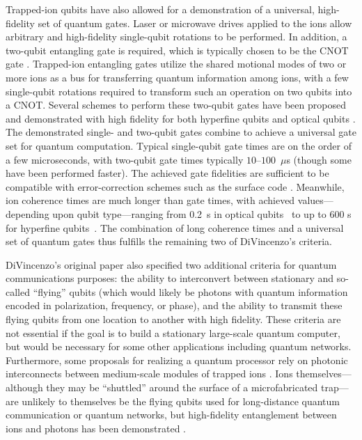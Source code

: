 \documentclass[%
12pt,
 amsmath,amssymb,
]{revtex4-2}
\begin{document}
Trapped-ion qubits have also allowed for a demonstration of a universal, high-fidelity set of quantum gates. Laser or microwave drives applied to the ions allow arbitrary and high-fidelity single-qubit rotations to be performed. In addition, a two-qubit entangling gate is required, which is typically chosen to be the CNOT gate \cite{BarencoElemGates1995}. Trapped-ion entangling gates utilize the shared motional modes of two or more ions as a bus for transferring quantum information among ions, with a few single-qubit rotations required to transform such an operation on two qubits into a CNOT. Several schemes to perform these two-qubit gates have been proposed \cite{CiracZollerGate, MolmerSorensenGate, LeibfriedDidiGate2003} and demonstrated with high fidelity for both hyperfine qubits \cite{Ballance2QubitHyperfineGate2016} and optical qubits \cite{BenhelmMSGate2008}. The demonstrated single- and two-qubit gates combine to achieve a universal gate set for quantum computation. Typical single-qubit gate times are on the order of a few microseconds, with two-qubit gate times typically $10$--$100$~$\mu$s (though some have been performed faster). The achieved gate fidelities are sufficient to be compatible with error-correction schemes such as the surface code \cite{RaussendorfSurfaceCode2007}. Meanwhile, ion coherence times are much longer than gate times, with achieved values---depending upon qubit type---ranging from 0.2~s in optical qubits~\cite{BermudezAssessing2017} to up to 600 s for hyperfine qubits~\cite{bollinger_IEEE_550s_ramsey,Wang10MinuteCoherence2017}. The combination of long coherence times and a universal set of quantum gates thus fulfills the remaining two of DiVincenzo's criteria.

DiVincenzo's original paper also specified two additional criteria for quantum communications purposes: the ability to interconvert between stationary and so-called ``flying'' qubits (which would likely be photons with quantum information encoded in polarization, frequency, or phase), and the ability to transmit these flying qubits from one location to another with high fidelity. These criteria are not essential if the goal is to build a stationary large-scale quantum computer, but would be necessary for some other applications including quantum networks. Furthermore, some proposals for realizing a quantum processor rely on photonic interconnects between medium-scale modules of trapped ions \cite{MonroeModularArch2014}. Ions themselves---although they may be ``shuttled'' around the surface of a microfabricated trap---are unlikely to themselves be the flying qubits used for long-distance quantum communication or quantum networks, but high-fidelity entanglement between ions and photons has been demonstrated \cite{BlinovIonPhotonEntangle2004}.
\end{document}

